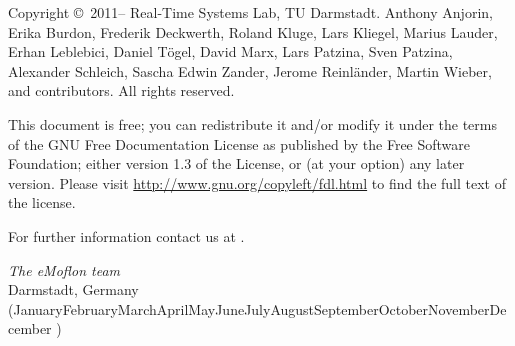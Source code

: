 \newcommand{\monthword}[1]{\ifcase#1\or January\or February\or March\or April\or May\or June\or July\or August\or September\or October\or November\or December\fi}
\begin{small} 
Copyright \copyright~2011--\the\year{} Real-Time Systems Lab, TU Darmstadt.
Anthony Anjorin, Erika Burdon, Frederik Deckwerth, Roland Kluge, Lars Kliegel, Marius Lauder,
Erhan Leblebici, Daniel T\"ogel, David Marx, Lars Patzina, Sven Patzina, Alexander Schleich, Sascha Edwin Zander, Jerome Reinl\"ander, Martin Wieber, and contributors.
All rights reserved.

This document is free; you can redistribute it and/or modify it under the terms of the GNU Free Documentation License as published by the Free Software Foundation; either version 1.3 of the License, or (at your option) any later version.
Please visit \href{http://www.gnu.org/copyleft/fdl.html}{http://www.gnu.org/copyleft/fdl.html} to find the full text of the license.
 
For further information contact us at \eMoflonContact.
  
\vskip3cm
\textit{The eMoflon team}\\
Darmstadt, Germany (\monthword{\month} \the\year)
\end{small}